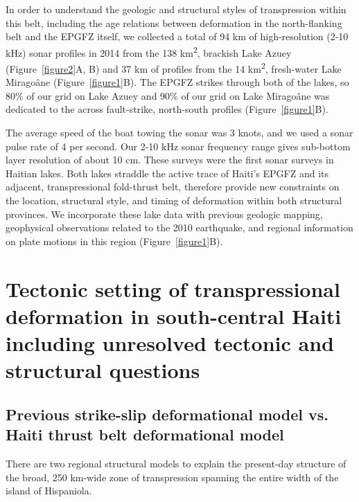 \documentclass[linenumbers,draft]{agujournal}
\begin{document}
In order to understand the geologic and structural styles of transpression within this belt, including the age relations between deformation in the north-flanking belt and the EPGFZ itself, we collected a total of 94 km of high-resolution (2-10 kHz) sonar profiles in 2014 from the 138 km\textsuperscript{2}, brackish Lake Azuey (Figure~\ref{figure2}A, B) and 37 km of profiles from the 14 km\textsuperscript{2}, fresh-water Lake Mirago\^ane (Figure~\ref{figure1}B). The EPGFZ strikes through both of the lakes, so 80\% of our grid on Lake Azuey and 90\% of our grid on Lake Mirago\^ane was dedicated to the across fault-strike, north-south profiles (Figure~\ref{figure1}B). 

The average speed of the boat towing the sonar was 3 knots, and we used a sonar pulse rate of 4 per second. Our 2-10 kHz sonar frequency range gives sub-bottom layer resolution of about 10 cm. These surveys were the first sonar surveys in Haitian lakes. Both lakes straddle the active trace of Haiti's EPGFZ and its adjacent, transpressional fold-thrust belt, therefore provide new constraints on the location, structural style, and timing of deformation within both structural provinces. We incorporate these lake data with previous geologic mapping, geophysical observations related to the 2010 earthquake, and regional information on plate motions in this region (Figure~\ref{figure1}B). 

\section{Tectonic setting of transpressional deformation in south-central Haiti including unresolved tectonic and structural questions}
\label{sec:tectonic}
\subsection{Previous strike-slip deformational model vs. Haiti thrust belt deformational model}
There are two regional structural models to explain the present-day structure of the broad, 250 km-wide zone of transpression spanning the entire width of the island of Hispaniola.
\end{document}
